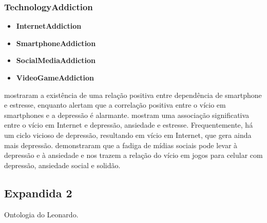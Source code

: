 \documentclass[12pt]{article}
\begin{document}
\subsubsection {TechnologyAddiction}
    \begin{itemize}
    \item \textbf{InternetAddiction}
    \item \textbf{SmartphoneAddiction}
    \item \textbf{SocialMediaAddiction}
    \item \textbf{VideoGameAddiction}
    \end{itemize}
    
\cite{samaha2016relationships} mostraram a existência de uma relação positiva entre dependência de smartphone e estresse, enquanto \cite{alhassan2018relationship} alertam que a correlação positiva entre o vício em smartphones e a depressão é alarmante. \cite{saikia2019internet} mostram uma associação significativa entre o vício em Internet e depressão, ansiedade e estresse. Frequentemente, há um ciclo vicioso de depressão, resultando em vício em Internet, que gera ainda mais depressão. \cite{dhir2018online}  demonstraram que a fadiga de mídias sociais pode levar à depressão e à ansiedade e \cite{wang2019association} nos trazem a relação do vício em jogos para celular com depressão, ansiedade social e solidão.

\subsection{Expandida 2}
Ontologia do Leonardo.





\end{document}
